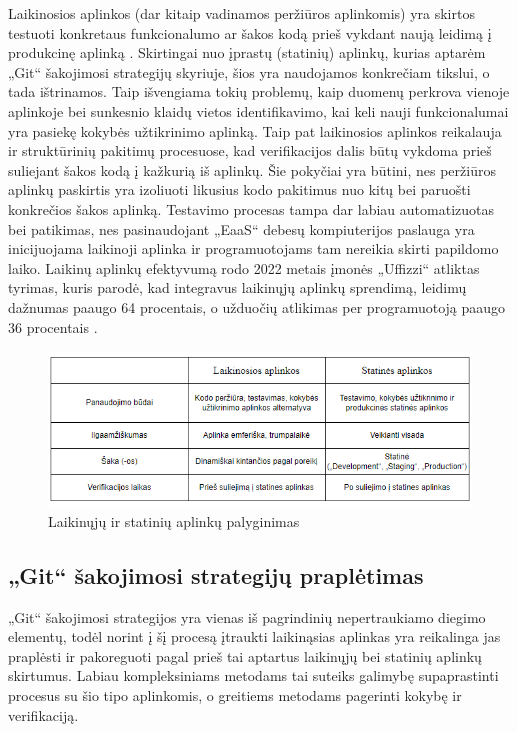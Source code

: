 \documentclass{VUMIFPSkursinis}
\begin{document}
Laikinosios aplinkos (dar kitaip vadinamos peržiūros aplinkomis) yra skirtos testuoti konkretaus funkcionalumo ar šakos kodą prieš vykdant naują leidimą į produkcinę aplinką \cite{SaltVienuoliktas}. Skirtingai nuo įprastų (statinių) aplinkų, kurias aptarėm „Git“ šakojimosi strategijų skyriuje, šios yra naudojamos konkrečiam tikslui, o tada ištrinamos. Taip išvengiama tokių problemų, kaip duomenų perkrova vienoje aplinkoje bei sunkesnio klaidų vietos identifikavimo, kai keli nauji funkcionalumai yra pasiekę kokybės užtikrinimo aplinką. Taip pat laikinosios aplinkos reikalauja ir struktūrinių pakitimų procesuose, kad verifikacijos dalis būtų vykdoma prieš suliejant šakos kodą į kažkurią iš aplinkų. Šie pokyčiai yra būtini, nes peržiūros aplinkų paskirtis yra izoliuoti likusius kodo pakitimus nuo kitų bei paruošti konkrečios šakos aplinką. Testavimo procesas tampa dar labiau automatizuotas bei patikimas, nes pasinaudojant „EaaS“ debesų kompiuterijos paslauga yra inicijuojama laikinoji aplinka ir programuotojams tam nereikia skirti papildomo laiko. Laikinų aplinkų efektyvumą rodo 2022 metais įmonės „Uffizzi“ atliktas tyrimas, kuris parodė, kad integravus laikinųjų aplinkų sprendimą, leidimų dažnumas paaugo 64 procentais, o užduočių atlikimas per programuotoją paaugo 36 procentais \cite{SaltDvyliktas}.

\begin{figure}[H]
    \centering
    \includegraphics[scale=0.9]{img/LaikinosVsStatines.png}
    \caption{Laikinųjų ir statinių aplinkų palyginimas}
    \label{img:mlp}
\end{figure}

\subsection{„Git“ šakojimosi strategijų praplėtimas}

„Git“ šakojimosi strategijos yra vienas iš pagrindinių nepertraukiamo diegimo elementų, todėl norint į šį procesą įtraukti laikinąsias aplinkas yra reikalinga jas praplėsti ir pakoreguoti pagal prieš tai aptartus laikinųjų bei statinių aplinkų skirtumus. Labiau kompleksiniams metodams tai suteiks galimybę supaprastinti procesus su šio tipo aplinkomis, o greitiems metodams pagerinti kokybę ir verifikaciją. 
\end{document}
